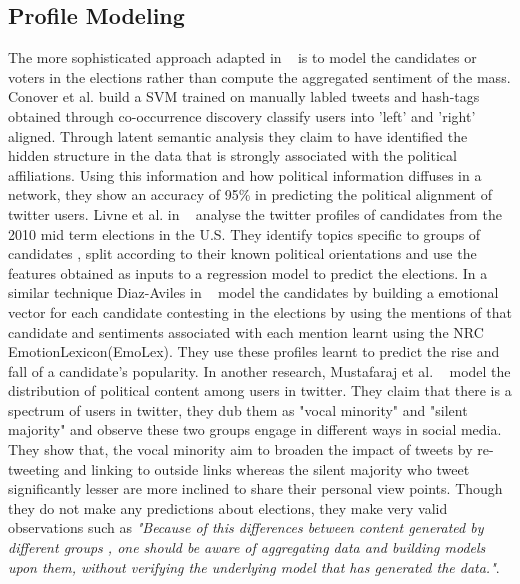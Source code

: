 \documentclass{article}
\begin{document}
\subsection{Profile Modeling}
The more sophisticated approach adapted in 
~\cite{livne2011party,conover2011predicting,diaz2012taking} is to model the candidates or
voters in the elections rather than compute the aggregated sentiment of the mass. 
Conover et al. build a SVM trained on manually labled tweets and hash-tags obtained
through co-occurrence discovery classify users into 'left' and 'right' aligned.
Through latent semantic analysis they claim to have identified the hidden structure 
in the data that is strongly associated with the political affiliations. 
Using this information and how political information diffuses in a network, they show 
an accuracy of 95\%  in predicting the political alignment of twitter users.
Livne et al. in ~\cite{livne2011party} analyse the twitter profiles of candidates from the 2010
mid term elections in the U.S. They identify topics specific to groups of candidates ,
split according to their known political orientations and use the features obtained as inputs
to a regression model to predict the elections.
In a similar technique Diaz-Aviles in ~\cite{diaz2012taking} model the candidates by building
a emotional vector for each candidate contesting in the elections by using the mentions
of that candidate and sentiments associated with each mention learnt using the NRC EmotionLexicon(EmoLex). 
They use these profiles learnt to predict the rise and fall of a candidate's popularity.
In another research, Mustafaraj et al. ~\cite{mustafaraj2011vocal} model the distribution 
of political content among users in twitter. They claim that there is a spectrum of users in twitter,
they dub them as "vocal minority" and "silent majority" and observe these two groups 
engage in different ways in social media. They show that, the vocal minority aim to
broaden the impact of tweets by re-tweeting and linking to outside links whereas 
the silent majority who tweet significantly lesser are more inclined to share their 
personal view points.
Though they do not make any predictions about elections, they make very valid observations
such as \emph{"Because of this differences between content generated by different groups ,
one should be aware of aggregating data and building models upon them, without verifying the
underlying model that has generated the data."}.

\end{document}
